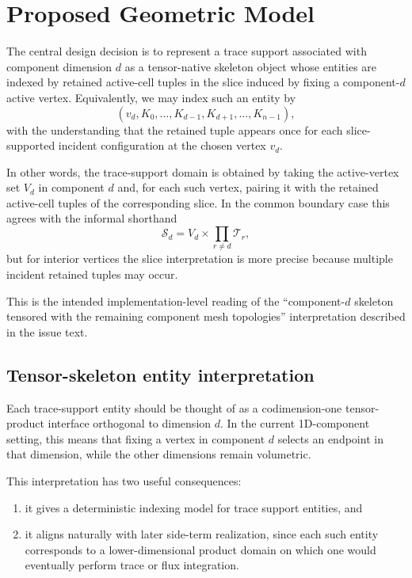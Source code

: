 \documentclass[11pt]{article}
\begin{document}
\section{Proposed Geometric Model}

The central design decision is to represent a trace support associated with component dimension $d$ as a tensor-native skeleton object whose entities are indexed by retained active-cell tuples in the slice induced by fixing a component-$d$ active vertex. Equivalently, we may index such an entity by
\[
(v_d, K_0, \dots, K_{d-1}, K_{d+1}, \dots, K_{n-1}),
\]
with the understanding that the retained tuple appears once for each slice-supported incident configuration at the chosen vertex $v_d$.

In other words, the trace-support domain is obtained by taking the active-vertex set $V_d$ in component $d$ and, for each such vertex, pairing it with the retained active-cell tuples of the corresponding slice. In the common boundary case this agrees with the informal shorthand
\[
\mathcal{S}_d = V_d \times \prod_{r \ne d} \mathcal{T}_r,
\]
but for interior vertices the slice interpretation is more precise because multiple incident retained tuples may occur.

This is the intended implementation-level reading of the ``component-$d$ skeleton tensored with the remaining component mesh topologies'' interpretation described in the issue text.

\subsection{Tensor-skeleton entity interpretation}

Each trace-support entity should be thought of as a codimension-one tensor-product interface orthogonal to dimension $d$. In the current 1D-component setting, this means that fixing a vertex in component $d$ selects an endpoint in that dimension, while the other dimensions remain volumetric.

This interpretation has two useful consequences:
\begin{enumerate}[leftmargin=2em]
  \item it gives a deterministic indexing model for trace support entities, and
  \item it aligns naturally with later side-term realization, since each such entity corresponds to a lower-dimensional product domain on which one would eventually perform trace or flux integration.
\end{enumerate}
\end{document}
